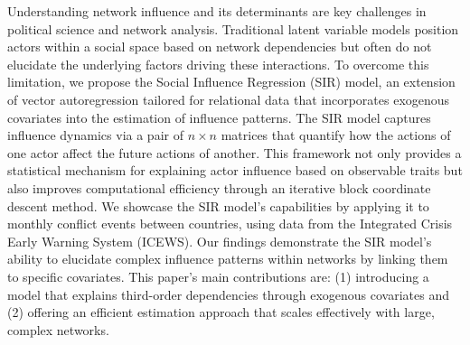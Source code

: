 Understanding network influence and its determinants are key challenges in political science and network analysis. Traditional latent variable models position actors within a social space based on network dependencies but often do not elucidate the underlying factors driving these interactions. To overcome this limitation, we propose the Social Influence Regression (SIR) model, an extension of vector autoregression tailored for relational data that incorporates exogenous covariates into the estimation of influence patterns. The SIR model captures influence dynamics via a pair of $n \times n$ matrices that quantify how the actions of one actor affect the future actions of another. This framework not only provides a statistical mechanism for explaining actor influence based on observable traits but also improves computational efficiency through an iterative block coordinate descent method. We showcase the SIR model's capabilities by applying it to monthly conflict events between countries, using data from the Integrated Crisis Early Warning System (ICEWS). Our findings demonstrate the SIR model's ability to elucidate complex influence patterns within networks by linking them to specific covariates. This paper's main contributions are: (1) introducing a model that explains third-order dependencies through exogenous covariates and (2) offering an efficient estimation approach that scales effectively with large, complex networks.